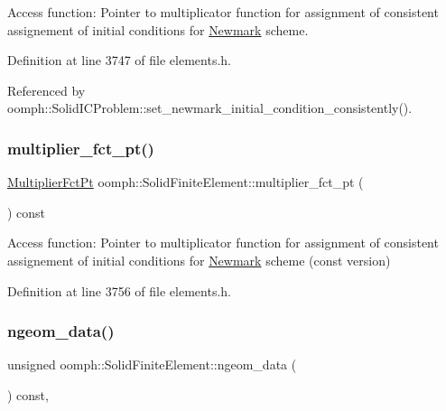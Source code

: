 Access function\+: Pointer to multiplicator function for assignment of consistent assignement of initial conditions for \hyperlink{classoomph_1_1Newmark}{Newmark} scheme. 



Definition at line 3747 of file elements.\+h.



Referenced by oomph\+::\+Solid\+I\+C\+Problem\+::set\+\_\+newmark\+\_\+initial\+\_\+condition\+\_\+consistently().

\mbox{\label{classoomph_1_1SolidFiniteElement_aff02a52591a62ab8c1f68088cf50f4f1}} 
\subsubsection{\texorpdfstring{multiplier\+\_\+fct\+\_\+pt()}{multiplier\_fct\_pt()}\hspace{0.1cm}{\footnotesize\ttfamily [2/2]}}
{\footnotesize\ttfamily \hyperlink{classoomph_1_1SolidFiniteElement_a1ec1cdf98041a51f77aab2b892856fc4}{Multiplier\+Fct\+Pt} oomph\+::\+Solid\+Finite\+Element\+::multiplier\+\_\+fct\+\_\+pt (\begin{DoxyParamCaption}{ }\end{DoxyParamCaption}) const\hspace{0.3cm}{\ttfamily [inline]}}



Access function\+: Pointer to multiplicator function for assignment of consistent assignement of initial conditions for \hyperlink{classoomph_1_1Newmark}{Newmark} scheme (const version) 



Definition at line 3756 of file elements.\+h.

\mbox{\label{classoomph_1_1SolidFiniteElement_a73f387da7f31f233b79c2526e8cbc896}} 
\subsubsection{\texorpdfstring{ngeom\+\_\+data()}{ngeom\_data()}}
{\footnotesize\ttfamily unsigned oomph\+::\+Solid\+Finite\+Element\+::ngeom\+\_\+data (\begin{DoxyParamCaption}{ }\end{DoxyParamCaption}) const\hspace{0.3cm}{\ttfamily [inline]}, {\ttfamily [virtual]}}



